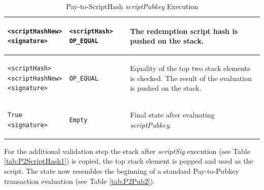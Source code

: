 \begin{table}[!ht]
\begin{minipage}{\textwidth}
\begin{tabular}{| m{105pt} | m{135pt} | m{100pt} |}
\vspace{8pt}
\begin{BVerbatim}[fontsize==\relsize{-4}]
<scriptHashNew>
<signature>
\end{BVerbatim} 
\vspace{4pt}
&
\vspace{8pt}
\begin{BVerbatim}[fontsize==\relsize{-4}]
<scriptHash> OP_EQUAL
\end{BVerbatim} 
\vspace{4pt}
&
The redemption script hash is pushed on the stack.\\ \hline


\vspace{8pt}
\begin{BVerbatim}[fontsize==\relsize{-4}]
<scriptHash>
<scriptHashNew>
<signature>
\end{BVerbatim} 
\vspace{4pt}
&
\vspace{8pt}
\begin{BVerbatim}[fontsize==\relsize{-4}]
OP_EQUAL
\end{BVerbatim} 
\vspace{4pt}
&
Equality of the top two stack elements is checked. The result of the evaluation is pushed on the stack.\\ \hline


\vspace{8pt}
\begin{BVerbatim}[fontsize==\relsize{-4}]
True
<signature>
\end{BVerbatim} 
\vspace{4pt}
&
\vspace{8pt}
\begin{BVerbatim}[fontsize==\relsize{-4}]
Empty
\end{BVerbatim} 
\vspace{4pt}
&
Final state after evaluating \textit{scriptPubkey}.\\ \hline

\end{tabular}
\vspace{5pt}
\caption{Pay-to-ScriptHash \textit{scriptPubkey} Execution}
\label{tab:P2ScriptHash2}
\end{minipage}
\end{table}

\vspace{-10pt}

\noindent
For the additional validation step the stack after \textit{scriptSig} execution (see Table \ref{tab:P2ScriptHash1}) is copied, the top stack element is popped and used as the script. The state now resembles the beginning of a standard Pay-to-Pubkey transaction evaluation (see Table \ref{tab:P2Pub2}).

